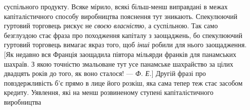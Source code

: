 суспільного продукту. Всяке мірило, всякі більш-менш виправдані в межах капіталістичного способу
виробництва пояснення тут зникають. Спекулюючий гуртовий торговець
рискує не \emph{своєю власністю}, а суспільною. Так само безглуздою стає фраза про походження капіталу з
заощаджень,
бо спекулюючий гуртовий торговець вимагає якраз того, щоб
\emph{інші} робили для нього заощадження. [Як недавно вся Франція
заощадила півтора мільярди франків для панамських шахраїв.
З якою точністю змальоване тут усе панамське шахрайство за
цілих двадцять років до того, як воно сталося! — \emph{Ф. Е.}]
Другій фразі про повздержливість б’є прямо в лице його розкіш, яка сама тепер теж стає засобом
кредиту. Уявлення, які
на менш розвиненому ступені капіталістичного виробництва
\parbreak{}  %
